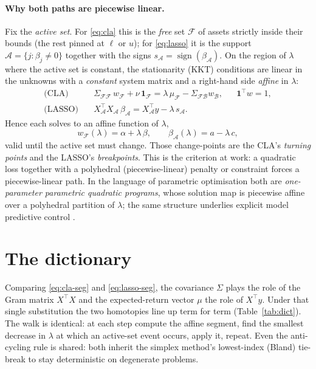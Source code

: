 \documentclass[11pt]{article}
\newcommand{\Sig}{\Sigma}
\newcommand{\F}{\mathcal{F}}
\newcommand{\B}{\mathcal{B}}
\newcommand{\Aset}{\mathcal{A}}
\newcommand{\trans}{^{\top}}
\newcommand{\lb}{\ell}
\newcommand{\ub}{u}
\begin{document}
\paragraph{Why both paths are piecewise linear.}
Fix the \emph{active set}. For \eqref{eq:cla} this is the \emph{free} set $\F$ of
assets strictly inside their bounds (the rest pinned at $\lb$ or $\ub$); for
\eqref{eq:lasso} it is the support $\Aset=\{j:\beta_j\neq 0\}$ together with the
signs $s_\Aset=\operatorname{sign}(\beta_\Aset)$. On the region of $\lambda$ where
the active set is constant, the stationarity (KKT) conditions are linear in the
unknowns with a \emph{constant} system matrix and a right-hand side
\emph{affine} in $\lambda$:
\begin{align}
\label{eq:cla-seg}
\text{(CLA)}\quad & \Sig_{\F\F}\, w_\F + \nu\,\mathbf{1}_\F = \lambda\,\mu_\F - \Sig_{\F\B}w_\B,
   && \mathbf{1}\trans w = 1, \\
\label{eq:lasso-seg}
\text{(LASSO)}\quad & X_\Aset\trans X_\Aset\, \beta_\Aset = X_\Aset\trans y - \lambda\, s_\Aset .
\end{align}
Hence each solves to an affine function of $\lambda$,
\[
w_\F(\lambda) = \alpha + \lambda\,\beta, \qquad
\beta_\Aset(\lambda) = a - \lambda\, c ,
\]
valid until the active set must change. Those change-points are the CLA's
\emph{turning points} and the LASSO's \emph{breakpoints}. This is the
\citet{rosset2007} criterion at work: a quadratic loss together with a polyhedral
(piecewise-linear) penalty or constraint forces a piecewise-linear path. In the
language of parametric optimisation both are \emph{one-parameter parametric
quadratic programs}, whose solution map is piecewise affine over a polyhedral
partition of $\lambda$; the same structure underlies explicit model predictive
control \citep{bemporad2002}.

\section{The dictionary}

Comparing \eqref{eq:cla-seg} and \eqref{eq:lasso-seg}, the covariance $\Sig$ plays
the role of the Gram matrix $X\trans X$ and the expected-return vector $\mu$ the
role of $X\trans y$. Under that single substitution the two homotopies line up term
for term (Table~\ref{tab:dict}). The walk is identical: at each step compute the
affine segment, find the smallest decrease in $\lambda$ at which an active-set event
occurs, apply it, repeat. Even the anti-cycling rule is shared: both inherit the
simplex method's lowest-index (Bland) tie-break to stay deterministic on degenerate
problems.
\end{document}
